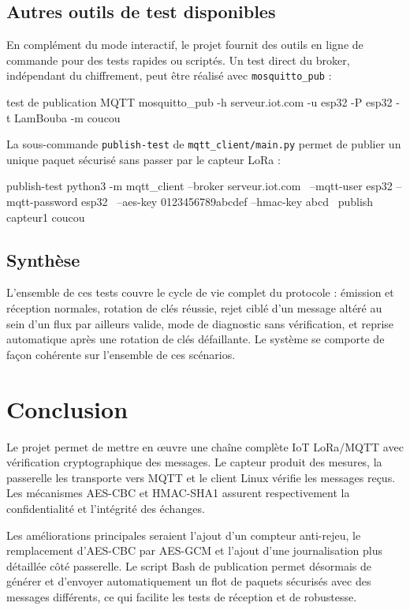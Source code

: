 \documentclass[a4paper,11pt]{report}
\begin{document}
\section{Autres outils de test disponibles}
En complément du mode interactif, le projet fournit des outils en ligne de commande pour des tests rapides
ou scriptés. Un test direct du broker, indépendant du chiffrement, peut être réalisé avec
\texttt{mosquitto\_pub} :
\begin{shellcode}{test de publication MQTT}
mosquitto_pub -h serveur.iot.com -u esp32 -P esp32 -t LamBouba -m coucou
\end{shellcode}
La sous-commande \texttt{publish-test} de \texttt{mqtt\_client/main.py} permet de publier un unique paquet
sécurisé sans passer par le capteur LoRa :
\begin{shellcode}{publish-test}
python3 -m mqtt_client --broker serveur.iot.com \
  --mqtt-user esp32 --mqtt-password esp32 \
  --aes-key 0123456789abcdef --hmac-key abcd \
  publish capteur1 coucou
\end{shellcode}

\section{Synthèse}
L'ensemble de ces tests couvre le cycle de vie complet du protocole : émission et réception normales,
rotation de clés réussie, rejet ciblé d'un message altéré au sein d'un flux par ailleurs valide, mode de
diagnostic sans vérification, et reprise automatique après une rotation de clés défaillante. Le système se
comporte de façon cohérente sur l'ensemble de ces scénarios.

\chapter{Conclusion}
\label{chap:conclusion}

Le projet permet de mettre en œuvre une chaîne complète IoT LoRa/MQTT avec vérification cryptographique
des messages. Le capteur produit des mesures, la passerelle les transporte vers MQTT et le client Linux
vérifie les messages reçus. Les mécanismes AES-CBC et HMAC-SHA1 assurent respectivement la confidentialité
et l'intégrité des échanges.

Les améliorations principales seraient l'ajout d'un compteur anti-rejeu, le remplacement d'AES-CBC par
AES-GCM et l'ajout d'une journalisation plus détaillée côté passerelle. Le script Bash de publication
permet désormais de générer et d'envoyer automatiquement un flot de paquets sécurisés avec des messages
différents, ce qui facilite les tests de réception et de robustesse.
\end{document}
